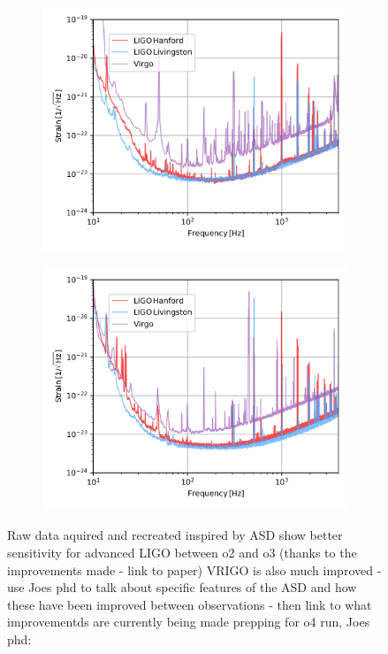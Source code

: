 \documentclass[11pt]{article}
\begin{document}
\begin{figure}[t!]
     \centering
     \begin{subfigure}[t]{0.47\linewidth}
         \centering
         \includegraphics[width=\linewidth]{shared_resources/shared_figs/o2_asd.png}
     \end{subfigure}
     \begin{subfigure}[t]{0.47\linewidth}
         \centering
         \includegraphics[width=\linewidth]{shared_resources/shared_figs/o3a_asd.png}
     \end{subfigure}
     \caption{Raw data aquired and recreated inspired by \cite{gwtc1,gwtc2} ASD show better sensitivity for advanced LIGO between o2 and o3 (thanks to the improvements made - link to paper) VRIGO is also much improved - use Joes phd to talk about specific features of the ASD and how these have been improved between observations - then link to what improvementds are currently being made prepping for o4 run, Joes phd: \cite{bayley2020phd}} 
     \label{fig:asd}
\end{figure}
\end{document}
